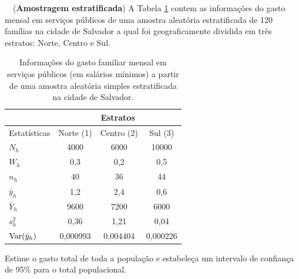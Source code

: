 \documentclass[a4paper,11pt,oneside,twocolumn]{Config/milktest}
\begin{document}
\medskip 
\question~~({\bf Amostragem estratificada}) A Tabela \ref{tab:2} contem as informações do gasto mensal em serviços públicos de uma amostra aleatória estratificada de 120 famílias na cidade de Salvador a qual foi geograficamente dividida em três estratos: Norte, Centro e Sul.

\begin{table}[!htb]
\begin{tabular}{l|ccc}
             & \multicolumn{3}{c}{Estratos}   \\ \hline
Estatísticas & Norte (1)   & Centro (2) & Sul (3)      \\ \hline
$N_h$        & 4000     & 6000     & 10000    \\
$W_h$        & 0,3      & 0,2      & 0,5      \\
$n_h$        & 40       & 36       & 44       \\
$\bar{y}_h$  & 1,2      & 2,4      & 0,6      \\
$\bar{Y}_h$  & 9600     & 7200     & 6000     \\
$s^2_h$             & 0,36     & 1,21     & 0,04     \\
${\rm Var}(\bar{y}_h)$          & 0,000993 & 0,004404 & 0,000226 \\ \hline
\end{tabular}
\caption{Informações do gasto familiar mensal em serviços públicos (em salários mínimos) a partir de uma amostra aleatória simples estratificada na cidade de Salvador.}
\label{tab:2}
\end{table}

Estime o  gasto total de toda a população e estabeleça um intervalo de confiança de 95\% para o total populacional.
 





\bigskip


\centering\color{cor}{\scshape boa prova}






% 

% 

% 

% 
\end{document}
